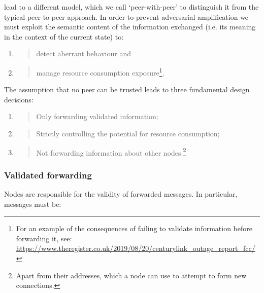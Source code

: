 \documentclass[11pt,a4paper]{article}
\begin{document}
lead to a different model, which we call `peer-with-peer' to distinguish
it from the typical peer-to-peer approach. In order to prevent
adversarial amplification we must exploit the semantic content of the
information exchanged (i.e. its meaning in the context of the current
state) to:

\begin{enumerate}
\def\labelenumi{\arabic{enumi}.}
\item
  \begin{quote}
  detect aberrant behaviour and
  \end{quote}
\item
  \begin{quote}
  manage resource consumption exposure\footnote{For an example of the
    consequences of failing to validate information before forwarding
    it, see:
    \href{https://www.theregister.co.uk/2019/08/20/centurylink_outage_report_fcc/}{{https://www.theregister.co.uk/2019/08/20/centurylink\_outage\_report\_fcc/}}}.
  \end{quote}
\end{enumerate}

The assumption that no peer can be trusted leads to three fundamental
design decisions:

\begin{enumerate}
\def\labelenumi{\arabic{enumi}.}
\item
  \begin{quote}
  Only forwarding validated information;
  \end{quote}
\item
  \begin{quote}
  Strictly controlling the potential for resource consumption;
  \end{quote}
\item
  \begin{quote}
  Not forwarding information about other nodes.\footnote{Apart from
    their addresses, which a node can use to attempt to form new
    connections.}
  \end{quote}
\end{enumerate}

\subsubsection{Validated forwarding}
\label{validated-forwarding}

Nodes are responsible for the validity of forwarded messages. In
particular, messages must be:
\end{document}
